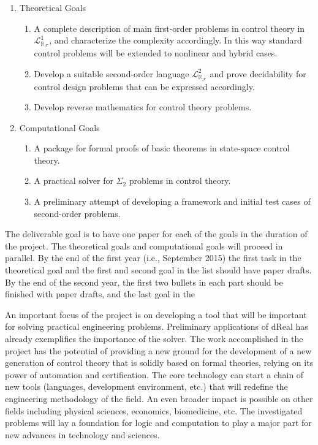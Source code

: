 \documentclass[10pt]{article}
\newcommand{\lrf}{\mathcal{L}_{\mathbb{R}_{\mathcal{F}}}}
\theoremstyle{definition}
\begin{document}
\begin{enumerate}
\item Theoretical Goals
\begin{enumerate}
\item A complete description of main first-order problems in control theory in $\lrf^1$, and characterize the complexity accordingly. In this way standard control problems will be extended to nonlinear and hybrid cases. 
\item Develop a suitable second-order language $\lrf^2$ and prove decidability for control design problems that can be expressed accordingly. 
\item Develop reverse mathematics for control theory problems.
\end{enumerate}
\item Computational Goals
\begin{enumerate}
\item A package for formal proofs of basic theorems in state-space control theory. 
\item A practical solver for $\Sigma_2$ problems in control theory. 
\item A preliminary attempt of developing a framework and initial test cases of second-order problems. 
\end{enumerate}
\end{enumerate}

The deliverable goal is to have one paper for each of the goals in the duration of the project. The theoretical goals and computational goals will proceed in parallel. By the end of the first year (i.e., September 2015) the first task in the theoretical goal and the first and second goal in the list should have paper drafts. By the end of the second year, the first two bullets in each part should be finished with paper drafts, and the last goal in the 

An important focus of the project is on developing a tool that will be important for solving practical engineering problems. Preliminary applications of dReal has already exemplifies the importance of the solver. The work accomplished in the project has the potential of providing a new ground for the development of a new generation of control theory that is solidly based on formal theories, relying on its power of automation and certification. The core technology can start a chain of new tools (languages, development environment, etc.) that will redefine the engineering methodology of the field. An even broader impact is possible on other fields including physical sciences, economics, biomedicine, etc. The investigated problems will lay a foundation for logic and computation to play a major part for new advances in technology and sciences. 


\newpage


\end{document}
